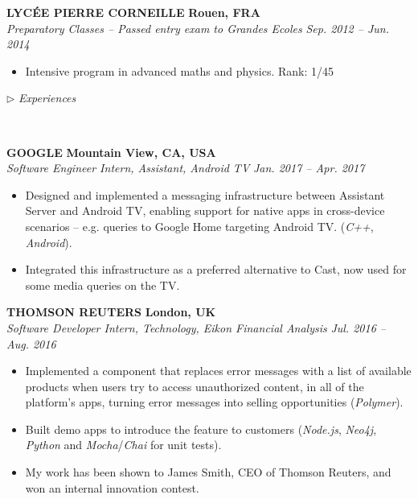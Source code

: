 \documentclass[a4paper, 12pt]{article}
\newcommand{\marginline}{-0.3cm}
\newcommand{\margincontent}{-0.6cm}
\newcommand{\marginbeforesection}{0.35cm}
\newcommand{\linewidthperso}{0.02cm}
\newcommand{\styletitle}[1]{\textbf{#1}}
\newcommand{\styledesc}[1]{\textit{#1}}
\newcommand{\styleloc}[1]{\textbf{#1}}
\newcommand{\styledates}[1]{\textit{#1}}
\newcommand{\stylesection}[1]{
  \vspace{\marginbeforesection}
  \begin{normalsize}$\triangleright$ \textit{#1}\end{normalsize}
  \vspace{\marginline}\\
  \noindent\makebox[\linewidth]{\rule{\textwidth}{\linewidthperso}}

}
\begin{document}
\begin{footnotesize}
\styletitle{LYC\'EE PIERRE CORNEILLE} \hfill \styleloc{Rouen, FRA}\\
\styledesc{Preparatory Classes -- Passed entry exam to Grandes Ecoles} \hfill \styledates{Sep. 2012 -- Jun. 2014}\\
\vspace{\margincontent}
\begin{itemize}
  \item Intensive program in advanced maths and physics. \hfill Rank: 1/45
\end{itemize}

\stylesection{Experiences}

\styletitle{GOOGLE} \hfill \styleloc{Mountain View, CA, USA}\\ 
\styledesc{Software Engineer Intern, Assistant, Android TV} \hfill \styledates{Jan. 2017 -- Apr. 2017}\\
\vspace{\margincontent}
\begin{itemize}
  \item Designed and implemented a messaging infrastructure between Assistant Server and Android TV, enabling support for native apps in cross-device scenarios -- e.g. queries to Google Home targeting Android TV. (\textit{C++}, \textit{Android}).
  \item Integrated this infrastructure as a preferred alternative to Cast, now used for some media queries on the TV.
\end{itemize}

\styletitle{THOMSON REUTERS} \hfill \styleloc{London, UK}\\ 
\styledesc{Software Developer Intern, Technology, Eikon Financial Analysis} \hfill \styledates{Jul. 2016 -- Aug. 2016}\\
\vspace{\margincontent}
\begin{itemize}
  \item Implemented a component that replaces error messages with a list of available products when users try to access unauthorized content, in all of the platform's apps, turning error messages into selling opportunities (\textit{Polymer}).
  \item Built demo apps to introduce the feature to customers (\textit{Node.js}, \textit{Neo4j}, \textit{Python} and \textit{Mocha}/\textit{Chai} for unit tests).
  \item My work has been shown to James Smith, CEO of Thomson Reuters, and won an internal innovation contest.
\end{itemize}


\end{footnotesize}
\end{document}
